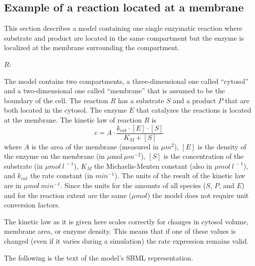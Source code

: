 

\subsection{Example of a reaction located at a membrane}
\label{sec:eg:membrane-reaction}

\label{sec:reaction-membrane-eg}This section describes a model containing
one single enzymatic reaction where substrate and product are located
in the same compartment but the enzyme is localized at the membrane
surrounding the compartment.

\begin{center}
$R$: 
\par\end{center}

The model contains two compartments, a three-dimensional one
called {}``cytosol'' and a two-dimensional one called
{}``membrane'' that is assumed to be the boundary of the cell. The
reaction $R$ has a substrate $S$ and a product $P$ that are both
located in the cytosol. The enzyme $E$ that catalyzes the
reactions is located at the membrane. The kinetic law of reaction
$R$ is\[ v=A\cdot\frac{k_{cat}\cdot[E]\cdot[S]}{K_{M}+[S]}\] where
$A$ is the area of the membrane (measured in $\mu m^{2}$), $[E]$
is the density of the enzyme on the membrane (in
$\mu\mathrm{mol}~\mu m^{-2}$), $[S]$ is the concentration of the
substrate (in $\mu mol~l^{\,-1}$), $K_{M}$ the Michaelis-Menten
constant (also in $\mu mol~l^{\,-1}$), and $k_{cat}$ the rate
constant (in $min^{-1}$). The units of the result of the kinetic
law are in $\mu mol~min^{-1}$. Since the units for the amounts of
all species ($S$, $P$, and $E$) and for the reaction extent are
the same ($\mu mol$) the model does not require unit conversion
factors.

The kinetic law as it is given here scales correctly for changes
in cytosol volume, membrane area, or enzyme density. This means
that if one of these values is changed (even if it varies during a
simulation) the rate expression remains valid.

The following is the text of the model's SBML representation.


